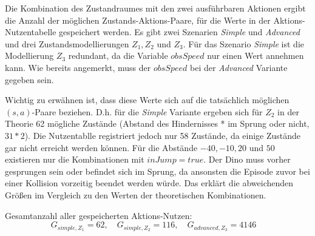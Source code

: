 Die Kombination des Zustandraumes mit den zwei ausführbaren Aktionen ergibt die Anzahl der möglichen Zustands-Aktions-Paare, für die Werte in der Aktions-Nutzentabelle gespeichert werden. Es gibt zwei Szenarien \textit{Simple} und \textit{Advanced} und drei Zustandsmodellierungen $Z_1, Z_2$ und $Z_3$.
Für das Szenario \textit{Simple} ist die Modellierung $Z_3$ redundant, da die Variable $obsSpeed$ nur einen Wert annehmen kann. Wie bereits angemerkt, muss der $obsSpeed$ bei der \textit{Advanced} Variante gegeben sein. 
\par 
Wichtig zu erwähnen ist, dass diese Werte sich auf die tatsächlich möglichen $(s,a)$-Paare beziehen. D.h. für die \textit{Simple} Variante ergeben sich für $Z_2$ in der Theorie 62 mögliche Zustände (Abstand des Hindernisses * im Sprung oder nicht, $31*2$). Die Nutzentablle registriert jedoch nur 58 Zustände, da einige Zustände gar nicht erreicht werden können. Für die Abstände $-40, -10, 20$ und $50$ existieren nur die Kombinationen mit $inJump = true$. Der Dino muss vorher gesprungen sein oder befindet sich im Sprung, da ansonsten die Episode zuvor bei einer Kollision vorzeitig beendet werden würde. Das erklärt die abweichenden Größen im Vergleich zu den Werten der theoretischen Kombinationen.
\par 
Gesamtanzahl aller gespeicherten Aktions-Nutzen:
\begin{equation}
G_{simple, Z_1} = 62, \quad
G_{simple, Z_2} = 116, \quad
G_{advanced, Z_3} = 4146 \quad 
\end{equation}


